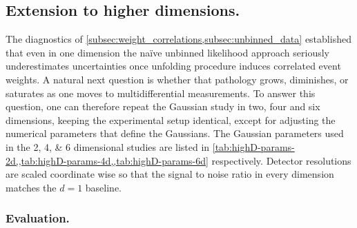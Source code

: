     \subsection{Extension to higher dimensions.}
    \label{sec:highD_extension}
        The diagnostics of \cref{subsec:weight_correlations,subsec:unbinned_data} established that even in {one} dimension the na\"ive unbinned likelihood approach
        seriously underestimates uncertainties once unfolding procedure induces correlated event weights.
        A natural next question is whether that pathology grows, diminishes, or saturates as one moves to multidifferential measurements.
        To answer this question, one can therefore repeat the Gaussian study in two, four and six dimensions, keeping the experimental setup identical, except for adjusting the numerical parameters that define the Gaussians.
        The Gaussian parameters used in the \numlist{2;4;6} dimensional studies are listed in \cref{tab:highD-params-2d,,tab:highD-params-4d,,tab:highD-params-6d} respectively.
        Detector resolutions are scaled coordinate wise so that the signal to noise ratio in every dimension matches the \(d=1\) baseline.

        \subsubsection{Evaluation.}
        
